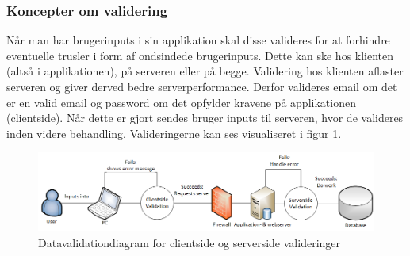 \documentclass[Rapport/Rapport_main.tex]{subfiles}
\begin{document}
\subsubsection{Koncepter om validering}
Når man har brugerinputs i sin applikation skal disse valideres for at forhindre eventuelle trusler i form af ondsindede brugerinputs. Dette kan ske hos klienten (altså i applikationen), på serveren eller på begge. Validering hos klienten aflaster serveren og giver derved bedre serverperformance. Derfor valideres email om det er en valid email og password om det opfylder kravene på applikationen (clientside). Når dette er gjort sendes bruger inputs til serveren, hvor de valideres inden videre behandling. Valideringerne kan ses visualiseret i figur \ref{fig:datavalidation_diagram}.

\begin{figure}[H]
    \centering
    \includegraphics[width=\textwidth]{Arkitektur/graphics/DataValidationDiagram.png}
    \caption{Datavalidationdiagram for clientside og serverside valideringer}
    \label{fig:datavalidation_diagram}
\end{figure}
\end{document}
